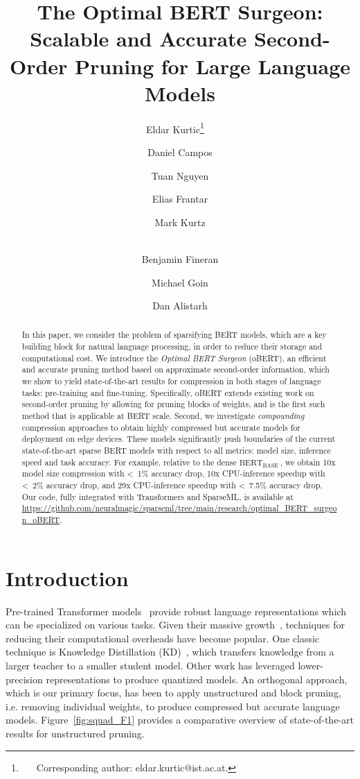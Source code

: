 \documentclass[11pt]{article}
\title{The Optimal BERT Surgeon: Scalable and Accurate Second-Order Pruning for Large Language Models}
\newcommand{\bert}{$\textrm{BERT}_{\textrm{BASE}}\,$}
\begin{document}
\author[1]{Eldar Kurtic\thanks{~~~Corresponding author: eldar.kurtic@ist.ac.at.}~~}
\author[2,3]{Daniel Campos}
\author[2]{Tuan Nguyen}
\author[1]{Elias Frantar}
\author[2]{Mark Kurtz}
\author[2]{\\Benjamin Fineran}
\author[2]{Michael Goin}
\author[1,2]{Dan Alistarh}

\maketitle
\begin{abstract}
In this paper, we consider the problem of sparsifying BERT models, which are a key building block for natural language processing, in order to reduce their storage and computational cost. 
We introduce the \emph{Optimal BERT Surgeon} (oBERT), 
an efficient and accurate pruning method based on approximate second-order information, which we show to yield state-of-the-art results for compression in both stages of language tasks: pre-training and fine-tuning. Specifically, oBERT extends existing work on second-order pruning by allowing for pruning blocks of weights, and is the first such method that is applicable at BERT scale. 
Second, we investigate \emph{compounding} compression approaches to obtain highly compressed but accurate models for deployment on edge devices. These models significantly push boundaries of the current state-of-the-art sparse BERT models with respect to all metrics: model size, inference speed and task accuracy. For example, relative to the dense \bert, we obtain 10x model size compression with \hbox{< 1\%} accuracy drop, 10x CPU-inference speedup with \hbox{< 2\%} accuracy drop, and 29x CPU-inference speedup with \hbox{< 7.5\%} accuracy drop. Our code, fully integrated with Transformers and SparseML, is available at
\url{https://github.com/neuralmagic/sparseml/tree/main/research/optimal\_BERT\_surgeon\_oBERT}.

\end{abstract}
\section{Introduction} 

Pre-trained Transformer models~\cite{Vaswani2017AttentionIA, Devlin2019BERTPO} provide robust language representations which can be specialized on various tasks. Given their massive  growth~\cite{Radford2019LanguageMA, MTNLG}, techniques for reducing their computational overheads have become popular. One classic technique is Knowledge Distillation (KD)~\cite{Hinton2015DistillingTK}, which transfers knowledge from a larger teacher to a smaller student model. Other work has leveraged lower-precision representations to produce quantized models. An orthogonal approach, which is our primary focus, has been to apply unstructured and block pruning, i.e. removing individual weights, to produce compressed but accurate language models. \mbox{Figure~\ref{fig:squad_F1}} provides a comparative overview of state-of-the-art results for unstructured pruning.
\end{document}
